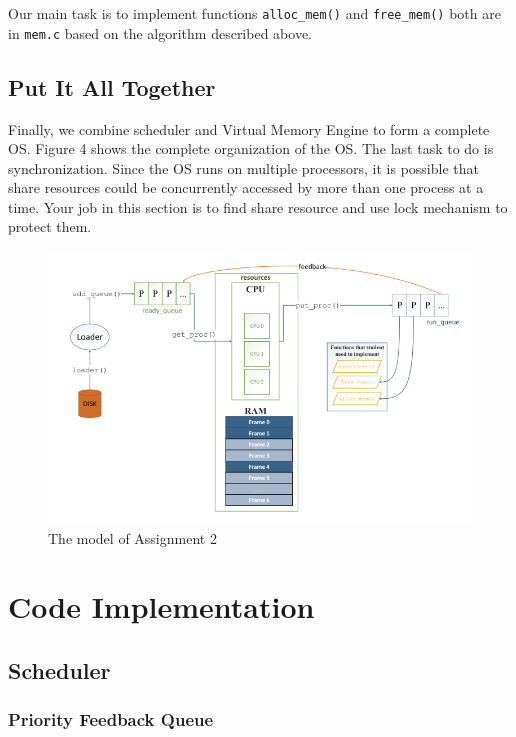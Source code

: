 \documentclass[a4paper]{article}
\numberwithin{equation}{section}
\begin{document}
Our main task is to implement functions \texttt{alloc_mem()} and \texttt{free_mem()} both are in \texttt{mem.c} based on the algorithm described above. 
\subsection{Put It All Together}

Finally, we combine scheduler and Virtual Memory Engine to form a complete OS. Figure 4 shows the complete organization of the OS. The last task to do is synchronization. Since the OS runs on multiple processors, it is possible that share resources could be concurrently accessed by more than one process at a time. Your job in this section is to find share resource and use lock mechanism to protect them.

\begin{figure}[H]
    \centering
    \includegraphics[width=1\textwidth]{os.png}
    \caption{The model of Assignment 2}
    \label{fig:os_figure}
\end{figure}

\newpage

\section{Code Implementation}
\subsection{Scheduler}

\subsubsection{Priority Feedback Queue}
\end{document}
